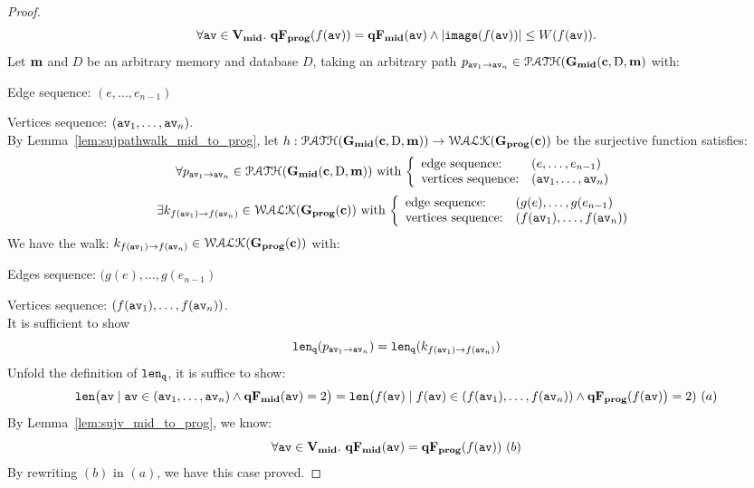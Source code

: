 \begin{proof}
$$
\forall \mathtt{av} \in \mathtt{\bf{V_{mid}}}. ~ \mathtt{\bf{qF_{prog}}}(f(\mathtt{av})) = \mathtt{\bf{qF_{mid}}}(\mathtt{av}) 
\land |\mathtt{image}(f(\mathtt{av}))| \leq W(f(\mathtt{av})).
$$
%
%
%
Let ${\boldsymbol{\mathbf{m}}}$ and $D$ be an arbitrary memory and database $D$,
taking an arbitrary path $p_{\mathtt{av}_1 \to \mathtt{av}_n} \in \mathcal{PATH}(\mathtt{\bf{G_{mid}}}({\boldsymbol{\mathbf{c}}}, \text{D}, {\boldsymbol{\mathbf{m}}})$ with:
%
\item Edge sequence: $(e, \ldots, e_{n-1})$
%
\item Vertices sequence: $(\mathtt{av}_1, \ldots, \mathtt{av}_n)$.
\\
By Lemma~\ref{lem:sujpathwalk_mid_to_prog}, let $h: \mathcal{PATH}(\mathtt{\bf{G_{mid}}}({\boldsymbol{\mathbf{c}}}, \text{D}, {\boldsymbol{\mathbf{m}}})) \to \mathcal{WALK}(\mathtt{\bf{G_{prog}}}({\boldsymbol{\mathbf{c}}}))$ be the surjective function satisfies:
%
\[
  \forall p_{\av_1 \to \av_n} \in \paths(\midG(\ssa{c}, \text{D}, \ssa{m}))
  \text{ with }
  \left\{
  \begin{array}{ll}
  \mbox{edge sequence:} & (e, \ldots, e_{n-1})
  \\ 
  \mbox{vertices sequence:} & (\av_1, \ldots, \av_n)
  \end{array}
  \right.
\]
%
\[
  \exists k_{f(\av_1) \to f(\av_n)} \in \walks(\progG(\ssa{c}))
  \text{ with }
  \left\{
  \begin{array}{ll}
  \mbox{edge sequence:} & (g(e), \ldots, g(e_{n-1}) 
  \\ 
  \mbox{vertices sequence:} & (f(\av_1), \ldots, f(\av_{n}))
  \end{array}
  \right.
\]
%
We have the walk:
$k_{f(\mathtt{av}_1) \to f(\mathtt{av}_n)} \in \mathcal{WALK}(\mathtt{\bf{G_{prog}}}({\boldsymbol{\mathbf{c}}}))$ with:
%
\item Edges sequence: $(g(e), \ldots, g(e_{n-1}) $
%
\item Vertices sequence: $(f(\mathtt{av}_1), \ldots, f(\mathtt{av}_{n}))$.
\\
It is sufficient to show 
%
\[
  \mathtt{len}_{\tt q}(p_{\mathtt{av}_1 \to \mathtt{av}_n}) = \mathtt{len}_{\tt q}(k_{f(\mathtt{av}_1) \to f(\mathtt{av}_n)})
\]
%
Unfold the definition of $\mathtt{len}_{\tt q}$, it is suffice to show:
\[
\mathtt{len} \big( \mathtt{av} \mid \mathtt{av} \in (\mathtt{av}_1, \ldots, \mathtt{av}_n) \land \mathtt{\bf{qF_{mid}}}(\mathtt{av}) = 2 \big) 
= \mathtt{len} \big(f(\mathtt{av}) \mid f(\mathtt{av}) \in (f(\mathtt{av}_1), \ldots, f(\mathtt{av}_{n})) \land \mathtt{\bf{qF_{prog}}}(f(\mathtt{av})\big) = 2) 
~ (a)
\]
%
By Lemma~\ref{lem:sujv_mid_to_prog}, we know:
%
\[
  \forall \mathtt{av} \in \mathtt{\bf{V_{mid}}}. ~ \mathtt{\bf{qF_{mid}}}(\mathtt{av}) = \mathtt{\bf{qF_{prog}}}(f(\mathtt{av})) ~(b)
\]
By rewriting $(b)$ in $(a)$, we have this case proved.

\end{proof}